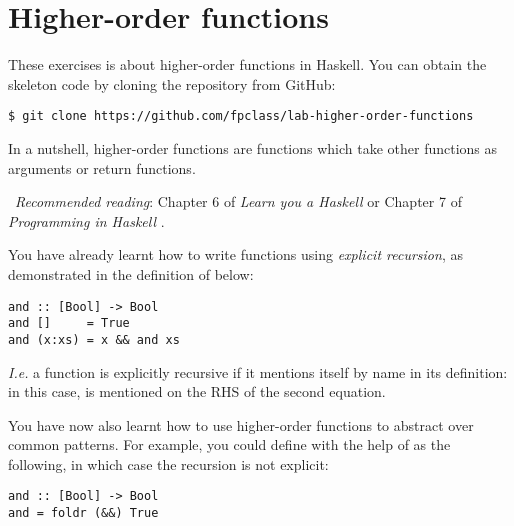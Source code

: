 \section{Higher-order functions} \label{sec:lab-hof}

These exercises is about higher-order functions in Haskell. You can obtain the skeleton code by cloning the repository from GitHub:
\begin{verbatim}
$ git clone https://github.com/fpclass/lab-higher-order-functions
\end{verbatim}
In a nutshell, higher-order functions are functions which take other functions as arguments or return functions.

\makebox[0.5cm]{\faBook}~\emph{Recommended reading}: Chapter 6 of \emph{Learn you a Haskell} \citep{lipovaca2011learn} or Chapter 7 of \emph{Programming in Haskell} \citep{hutton2016programming}.

\taskLine


\taskLine

You have already learnt how to write functions using \emph{explicit recursion}, as demonstrated in the definition of  below:
\begin{verbatim}
and :: [Bool] -> Bool
and []     = True 
and (x:xs) = x && and xs
\end{verbatim}
\emph{I.e.} a function is explicitly recursive if it mentions itself by name in its definition: in this case,  is mentioned on the RHS of the second equation.

You have now also learnt how to use higher-order functions to abstract over common patterns. For example, you could define  with the help of  as the following, in which case the recursion is not explicit:
\begin{verbatim}
and :: [Bool] -> Bool 
and = foldr (&&) True
\end{verbatim} 

